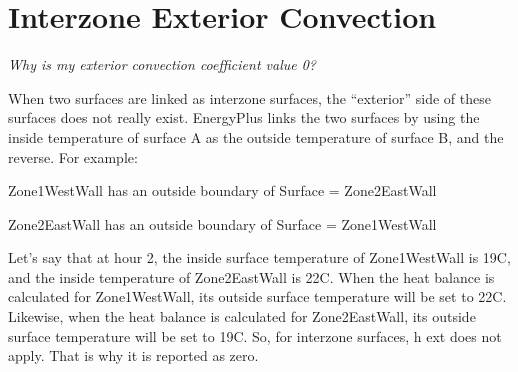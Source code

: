 \section{Interzone Exterior Convection}\label{interzone-exterior-convection}

\emph{Why is my exterior convection coefficient value 0?}

When two surfaces are linked as interzone surfaces, the ``exterior'' side of these surfaces does not really exist. EnergyPlus links the two surfaces by using the inside temperature of surface A as the outside temperature of surface B, and the reverse. For example:

Zone1WestWall has an outside boundary of Surface = Zone2EastWall

Zone2EastWall has an outside boundary of Surface = Zone1WestWall

Let's say that at hour 2, the inside surface temperature of Zone1WestWall is 19C, and the inside temperature of Zone2EastWall is 22C. When the heat balance is calculated for Zone1WestWall, its outside surface temperature will be set to 22C. Likewise, when the heat balance is calculated for Zone2EastWall, its outside surface temperature will be set to 19C. So, for interzone surfaces, h ext does not apply. That is why it is reported as zero.
